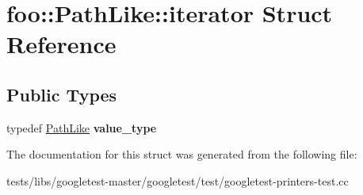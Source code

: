 \hypertarget{structfoo_1_1PathLike_1_1iterator}{}\section{foo\+:\+:Path\+Like\+:\+:iterator Struct Reference}
\label{structfoo_1_1PathLike_1_1iterator}
\subsection*{Public Types}
\begin{DoxyCompactItemize}
\item 
\mbox{\label{structfoo_1_1PathLike_1_1iterator_a797c204878a09e04b23cfe6b48ac7016}} 
typedef \hyperlink{classfoo_1_1PathLike}{Path\+Like} {\bfseries value\+\_\+type}
\end{DoxyCompactItemize}


The documentation for this struct was generated from the following file\+:\begin{DoxyCompactItemize}
\item 
tests/libs/googletest-\/master/googletest/test/googletest-\/printers-\/test.\+cc\end{DoxyCompactItemize}
